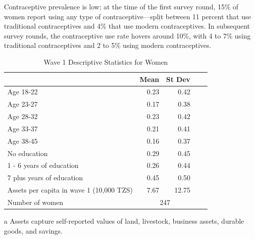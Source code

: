 \documentclass[letterpaper,12pt]{article}
\newcommand{\mco}[1]{\multicolumn{1}{c}{#1}}
\newcommand{\mct}[1]{\multicolumn{2}{c}{#1}}
\begin{document}
Contraceptive prevalence is low; at the time of the first survey round, 15\% 
of women report using any type of contraceptive---split between 11 percent that use 
traditional contraceptives and 4\% that use modern contraceptives.
In subsequent survey rounds, the contraceptive use rate hovers around 10\%, 
with 4 to 7\% using traditional contraceptives and 2 to 5\% 
using modern contraceptives.



\begin{table}
\centering
\footnotesize
\begin{threeparttable}
\caption{Wave 1 Descriptive Statistics for Women}
\label{tab:desc_stat_women}
\begin{tabular}{l  D{.}{.}{3,2} D{.}{.}{3,2} D{.}{.}{3,2} D{.}{.}{3,2}} \toprule
                            	 & \mco{Mean} 	 & 	\mco{St Dev}	  \\ \midrule
Age 18-22                                              &        0.23&        0.42\\
Age 23-27                                              &        0.17&        0.38\\
Age 28-32                                              &        0.23&        0.42\\
Age 33-37                                              &        0.21&        0.41\\
Age 38-45                                              &        0.16&        0.37\\ \addlinespace 
No education                                           &        0.29&        0.45\\
1 - 6 years of education                               &        0.26&        0.44\\
7 plus years of education                              &        0.45&        0.50\\ \addlinespace 
Assets per capita in wave 1 (10,000 TZS)      &        7.67&       12.75\\ \addlinespace 
Number of women                                        &     \mct{247}            \\
\bottomrule
\end{tabular}
\begin{tablenotes} 
\scriptsize
\item[a] Assets capture self-reported values of land, livestock, business assets, durable
goods, and savings.
\end{tablenotes}
\end{threeparttable}
\end{table}
\end{document}
